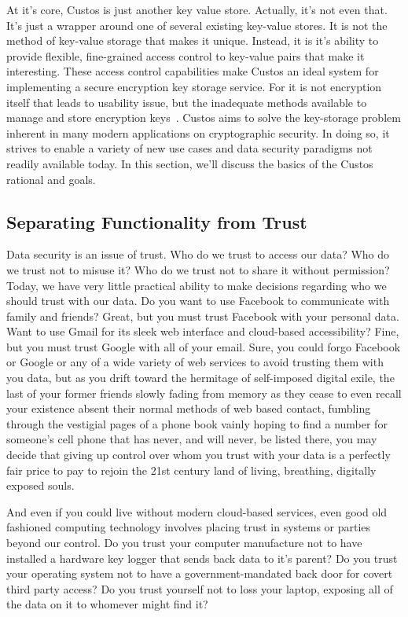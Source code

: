 At it's core, Custos is just another key value store. Actually, it's
not even that. It's just a wrapper around one of several existing
key-value stores. It is not the method of key-value storage that makes
it unique. Instead, it is it's ability to provide flexible,
fine-grained access control to key-value pairs that make it
interesting. These access control capabilities make Custos an ideal
system for implementing a secure encryption key storage service. For
it is not encryption itself that leads to usability issue, but the
inadequate methods available to manage and store encryption
keys~\cite{Kher2005}. Custos aims to solve the key-storage problem
inherent in many modern applications on cryptographic security. In
doing so, it strives to enable a variety of new use cases and data
security paradigms not readily available today. In this section, we'll
discuss the basics of the Custos rational and goals.

\subsection{Separating Functionality from Trust}

Data security is an issue of trust. Who do we trust to access our
data? Who do we trust not to misuse it? Who do we trust not to share
it without permission? Today, we have very little practical ability to
make decisions regarding who we should trust with our data. Do you
want to use Facebook to communicate with family and friends? Great,
but you must trust Facebook with your personal data. Want to use Gmail
for its sleek web interface and cloud-based accessibility? Fine, but
you must trust Google with all of your email. Sure, you could forgo
Facebook or Google or any of a wide variety of web services to avoid
trusting them with you data, but as you drift toward the hermitage of
self-imposed digital exile, the last of your former friends slowly
fading from memory as they cease to even recall your existence absent
their normal methods of web based contact, fumbling through the
vestigial pages of a phone book vainly hoping to find a number for
someone's cell phone that has never, and will never, be listed there,
you may decide that giving up control over whom you trust with your
data is a perfectly fair price to pay to rejoin the 21st century land
of living, breathing, digitally exposed souls.

And even if you could live without modern cloud-based services, even
good old fashioned computing technology involves placing trust in
systems or parties beyond our control. Do you trust your computer
manufacture not to have installed a hardware key logger that sends
back data to it's parent? Do you trust your operating system not to
have a government-mandated back door for covert third party access?
Do you trust yourself not to loss your laptop, exposing all of the
data on it to whomever might find it?


